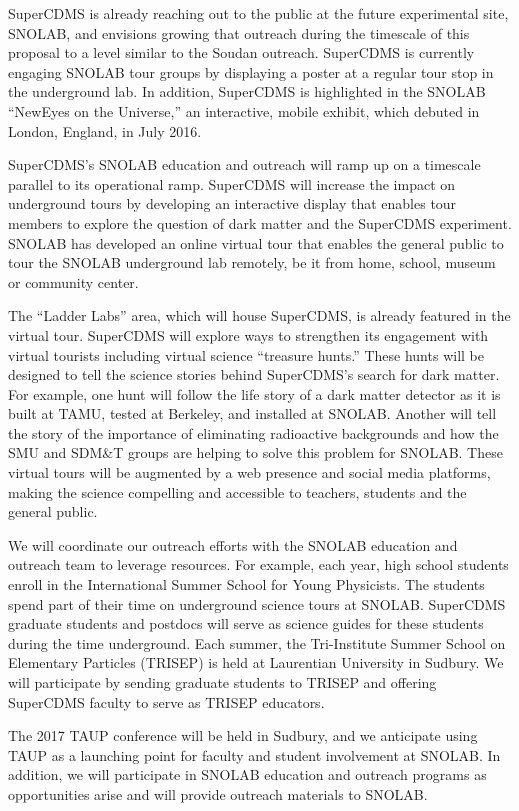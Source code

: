 SuperCDMS is already reaching out to the public at the future experimental site, SNOLAB, and envisions growing that outreach during the timescale of this proposal to a level similar to the Soudan outreach. SuperCDMS is currently engaging SNOLAB tour groups by displaying a poster at a regular tour stop in the underground lab. In addition, SuperCDMS is highlighted in the SNOLAB “NewEyes on the Universe,” an interactive, mobile exhibit, which debuted in London, England, in July 2016.

SuperCDMS’s SNOLAB education and outreach will ramp up on a timescale parallel to its operational ramp. SuperCDMS will increase the impact on underground tours by developing an interactive display that enables tour members to explore the question of dark matter and the SuperCDMS experiment. SNOLAB has developed an online virtual tour that enables the general public to tour the SNOLAB underground lab remotely, be it from home, school, museum or community center. 

The “Ladder Labs” area, which will house SuperCDMS, is already featured in the virtual tour. SuperCDMS will explore ways to strengthen its engagement with virtual tourists including virtual science “treasure hunts.” These hunts will be designed to tell the science stories behind SuperCDMS’s search for dark matter. For example, one hunt will follow the life story of a dark matter detector as it is built at TAMU, tested at Berkeley, and installed at SNOLAB. Another will tell the story of the importance of eliminating radioactive backgrounds and how the SMU and SDM\&T groups are helping to solve this problem for SNOLAB. These virtual tours will be augmented by a web presence and social media platforms, making the science compelling and accessible to teachers, students and the general public.

We will coordinate our outreach efforts with the SNOLAB education and outreach team to leverage resources. For example, each year, high school students enroll in the International Summer School for Young Physicists. The students spend part of their time on underground science tours at SNOLAB. SuperCDMS graduate students and postdocs will serve as science guides for these students during the time underground. Each summer, the Tri-Institute Summer School on Elementary Particles (TRISEP) is held at Laurentian University in Sudbury. We will participate by sending graduate students to TRISEP and offering SuperCDMS faculty to serve as TRISEP educators. 

The 2017 TAUP conference will be held in Sudbury, and we anticipate using TAUP as a launching point for faculty and student involvement at SNOLAB. In addition, we will participate in SNOLAB education and outreach programs as opportunities arise and will provide outreach materials to SNOLAB.

